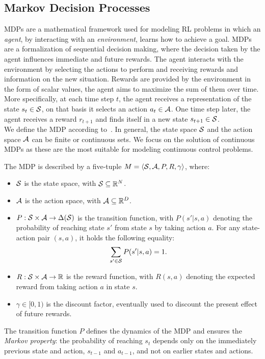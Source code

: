 \subsection{Markov Decision Processes}\label{subsec:mdp}
\acf{MDPs} are a mathematical framework used for modeling \ac{RL} problems in which an \emph{agent}, by interacting with an \emph{environment}, learns how to achieve a goal. \ac{MDPs} are a formalization of sequential decision making, where the decision taken by the agent influences immediate and future rewards. The agent interacts with the environment by selecting the actions to perform and receiving rewards and information on the new situation. Rewards are provided by the environment in the form of scalar values, the agent aims to maximize the sum of them over time. More specifically, at each time step $t$, the agent receives a representation of the state $s_t \in \mathcal{S}$, on that basis it selects an action $a_t \in \mathcal{A}$. One time step later, the agent receives a reward $r_{t+1}$ and finds itself in a new state $s_{t+1} \in \mathcal{S}$.\\
\newline
We define the \ac{MDP} according to~\citep[]{puterman2014markov}. In general, the state space $\mathcal{S}$ and the action space $\mathcal{A}$ can be finite or continuous sets. We focus on the solution of continuous \ac{MDPs} as these are the most suitable for modeling continuous control problems.
\begin{definition}[MDP]\label{def:mdp}
The \ac{MDP} is described by a five-tuple $M=\langle \mathcal{S}, \mathcal{A}, P, R, \gamma \rangle$, where:
\begin{itemize}
	\item $\mathcal{S}$ is the state space, with $\mathcal{S}\subseteq\mathbb{R}^N$.
	\item $\mathcal{A}$ is the action space, with $\mathcal{A}\subseteq\mathbb{R}^D$.
	\item $P: \mathcal{S} \times \mathcal{A} \to \Delta(\mathcal{S})$ is the transition function, with $P(s'|s,a)$ denoting the probability of reaching state $s'$ from state $s$ by taking action $a$. For any state-action pair $(s,a)$, it holds the following equality:
	$$ \sum_{s' \in \mathcal{S}} P(s'|s,a) = 1.$$
	\item $R: \mathcal{S} \times \mathcal{A} \to \mathbb{R}$ is the reward function, with $R(s,a)$ denoting the expected reward from taking action $a$ in state $s$.
	\item $\gamma \in [0, 1)$ is the discount factor, eventually used to discount the present effect of future rewards.
\end{itemize}
\end{definition}
The transition function $P$ defines the dynamics of the \ac{MDP} and ensures the \emph{Markov property}: the probability of reaching $s_t$ depends only on the immediately previous state and action, $s_{t-1}$ and $a_{t-1}$, and not on earlier states and actions.
